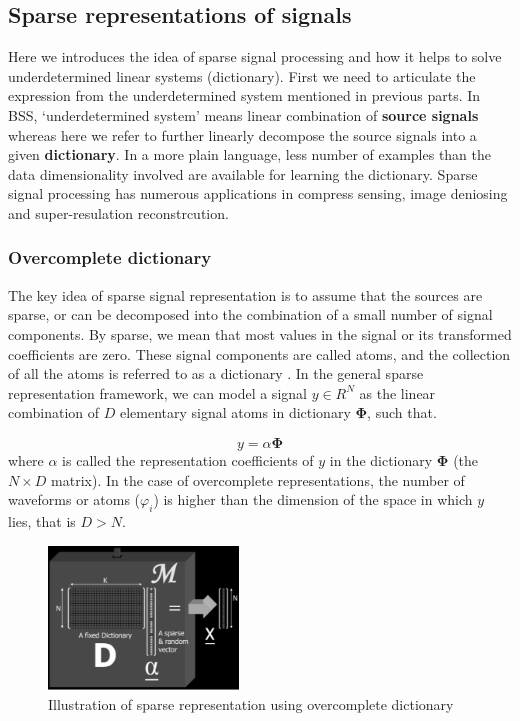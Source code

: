 \subsection{Sparse representations of signals}
Here we introduces the idea of sparse signal processing and how it helps to solve underdetermined linear systems (dictionary). First we need to articulate the expression from the underdetermined system mentioned in previous parts. In BSS, `underdetermined system' means linear combination of \textbf{source signals} whereas here we refer to further linearly decompose the source signals into a given \textbf{dictionary}. In a more plain language, less number of examples than the data dimensionality involved are available for learning the dictionary. Sparse signal processing has numerous applications in compress sensing, image deniosing and super-resulation reconstrcution.

\subsubsection{Overcomplete dictionary}
\label{over_dict}
The key idea of sparse signal representation is to assume
that the sources are sparse, or can be decomposed into the
combination of a small number of signal components. By
sparse, we mean that most values in the signal or its transformed coefficients are zero. These signal components are called atoms, and the collection of all the atoms is referred to as a dictionary \cite{Mallat_Zhang1993}. In the general sparse representation framework, we can model a signal $y \in R^N$ as the linear combination of $D$ elementary signal atoms in dictionary $\mathbf{\Phi}$, such that.

\begin{equation}
    y = \alpha \mathbf{\Phi}
    \label{dict_qe1}
\end{equation}
where $\alpha$ is called the representation coefficients of $y$ in the dictionary $\mathbf{\Phi}$
(the $N \times D$ matrix). 
In the case of overcomplete representations, the number of waveforms or atoms ($\varphi_i$) is higher than the dimension of the space in which $y$ lies, that is $D > N$. 

\begin{figure}[!htbp]
\centering
\includegraphics[width=0.45\textwidth]{images/dictionary_sparse.png}
\caption{Illustration of sparse representation using overcomplete dictionary}
\label{dic1}
\end{figure}

